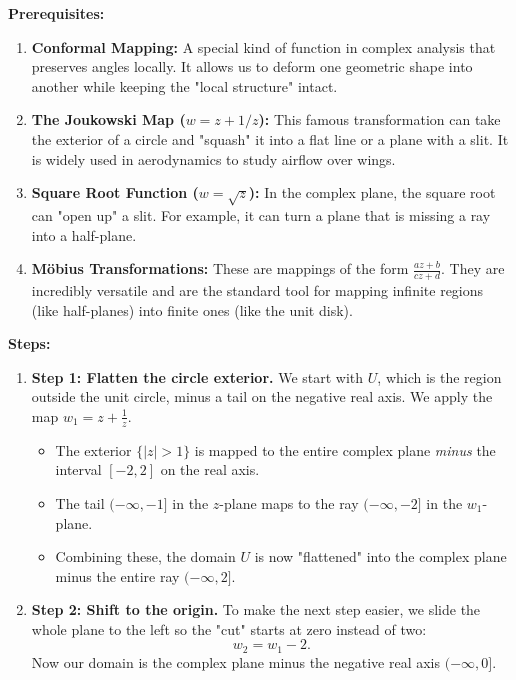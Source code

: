 \begin{solution}
\textbf{Prerequisites:}
\begin{enumerate}
    \item \textbf{Conformal Mapping:} A special kind of function in complex analysis that preserves angles locally. It allows us to deform one geometric shape into another while keeping the "local structure" intact.
    \item \textbf{The Joukowski Map ($w = z + 1/z$):} This famous transformation can take the exterior of a circle and "squash" it into a flat line or a plane with a slit. It is widely used in aerodynamics to study airflow over wings.
    \item \textbf{Square Root Function ($w = \sqrt{z}$):} In the complex plane, the square root can "open up" a slit. For example, it can turn a plane that is missing a ray into a half-plane.
    \item \textbf{Möbius Transformations:} These are mappings of the form $\frac{az+b}{cz+d}$. They are incredibly versatile and are the standard tool for mapping infinite regions (like half-planes) into finite ones (like the unit disk).
\end{enumerate}

\textbf{Steps:}
\begin{enumerate}
    \item \textbf{Step 1: Flatten the circle exterior.}
        We start with $U$, which is the region outside the unit circle, minus a tail on the negative real axis. We apply the map $w_1 = z + \frac{1}{z}$.
        \begin{itemize}
            \item The exterior $\{|z| > 1\}$ is mapped to the entire complex plane \textit{minus} the interval $[-2, 2]$ on the real axis.
            \item The tail $(-\infty, -1]$ in the $z$-plane maps to the ray $(-\infty, -2]$ in the $w_1$-plane.
            \item Combining these, the domain $U$ is now "flattened" into the complex plane minus the entire ray $(-\infty, 2]$.
        \end{itemize}

    \item \textbf{Step 2: Shift to the origin.}
        To make the next step easier, we slide the whole plane to the left so the "cut" starts at zero instead of two:
        \[ w_2 = w_1 - 2. \]
        Now our domain is the complex plane minus the negative real axis $(-\infty, 0]$.


\end{enumerate}
\end{solution}
